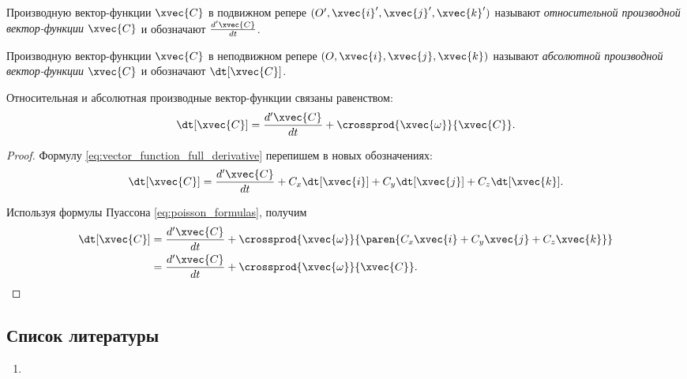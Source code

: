 \begin{definition}
  Производную вектор-функции $\xvec{C}$ в подвижном репере $(O', \xvec{i}',
  \xvec{j}', \xvec{k}')$ называют \textit{относительной производной
  вектор-функции $\xvec{C}$} и обозначают $\frac{d' \xvec{C}}{dt}$.
\end{definition}

\begin{definition}
  Производную вектор-функции $\xvec{C}$ в неподвижном репере $(O, \xvec{i},
  \xvec{j}, \xvec{k})$ называют \textit{абсолютной производной вектор-функции
  $\xvec{C}$} и обозначают $\dt[\xvec{C}]$.
\end{definition}

\begin{theorem}
  Относительная и абсолютная производные вектор-функции связаны равенством:
  \begin{equation*}
    \dt[\xvec{C}] = \frac{d' \xvec{C}}{dt} +
      \crossprod{\xvec{\omega}}{\xvec{C}}.
  \end{equation*}
\end{theorem}

\begin{proof}
  Формулу \ref{eq:vector_function_full_derivative} перепишем в новых
  обозначениях:
  \begin{equation*}
    \dt[\xvec{C}] = \frac{d' \xvec{C}}{dt}
      + C_x \dt[\xvec{i}] + C_y \dt[\xvec{j}] + C_z \dt[\xvec{k}].
  \end{equation*}
  
  Используя формулы Пуассона \ref{eq:poisson_formulas}, получим
  \begin{equation*}
    \begin{aligned}
      \dt[\xvec{C}] &= \frac{d' \xvec{C}}{dt}
        + \crossprod
          {\xvec{\omega}}
          {\paren{C_x \xvec{i} + C_y \xvec{j} + C_z \xvec{k}}} \\
      &= \frac{d' \xvec{C}}{dt} + \crossprod{\xvec{\omega}}{\xvec{C}}.
    \end{aligned}
  \end{equation*}
\end{proof}

\subsection{Список литературы}
\begin{enumerate}
  \item \cite{lectures}
\end{enumerate}

